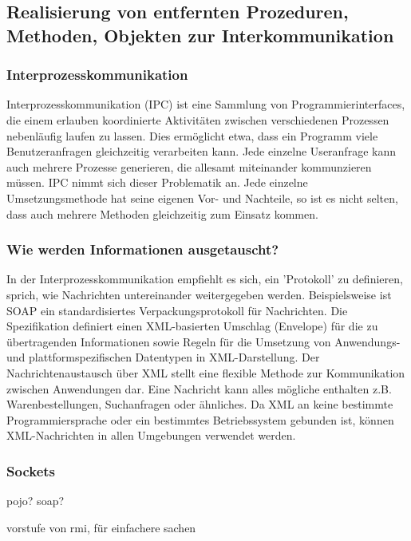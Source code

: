 \documentclass[letterpaper, 12pt]{article}
\let\tempsubsection\subsection
\renewcommand\subsection[1]{\vspace{0cm}\tempsubsection{#1}\vspace{0cm}}
\let\tempsubsubsection\subsubsection
\renewcommand\subsubsection[1]{\vspace{0cm}\tempsubsubsection{#1}\vspace{0cm}}
\begin{document}
\subsection{Realisierung von entfernten Prozeduren, Methoden, Objekten zur Interkommunikation}

\subsubsection{Interprozesskommunikation}

Interprozesskommunikation (IPC) ist eine Sammlung von Programmierinterfaces, die einem erlauben koordinierte Aktivitäten zwischen verschiedenen Prozessen nebenläufig laufen zu lassen. Dies ermöglicht etwa, dass ein Programm viele Benutzeranfragen gleichzeitig verarbeiten kann. Jede einzelne Useranfrage kann auch mehrere Prozesse generieren, die allesamt miteinander kommunzieren müssen. IPC nimmt sich dieser Problematik an. Jede einzelne Umsetzungsmethode hat seine eigenen Vor- und Nachteile, so ist es nicht selten, dass auch mehrere Methoden gleichzeitig zum Einsatz kommen. \cite{ipc}

\subsubsection{Wie werden Informationen ausgetauscht?}

In der Interprozesskommunikation empfiehlt es sich, ein 'Protokoll' zu definieren, sprich, wie Nachrichten untereinander weitergegeben werden. Beispielsweise ist SOAP ein standardisiertes Verpackungsprotokoll für Nachrichten. Die Spezifikation definiert einen XML-basierten Umschlag (Envelope) für die zu übertragenden Informationen sowie Regeln für die Umsetzung von Anwendungs- und plattformspezifischen Datentypen in XML-Darstellung. Der Nachrichtenaustausch über XML stellt eine flexible Methode zur Kommunikation zwischen Anwendungen dar. Eine Nachricht kann alles mögliche enthalten z.B. Warenbestellungen, Suchanfragen oder ähnliches. Da XML an keine bestimmte Programmiersprache oder ein bestimmtes Betriebssystem gebunden ist, können XML-Nachrichten in allen Umgebungen verwendet werden. \cite{ausarbeitungsoa}

\subsubsection{Sockets}

pojo? soap?

vorstufe von rmi, für einfachere sachen
\end{document}
